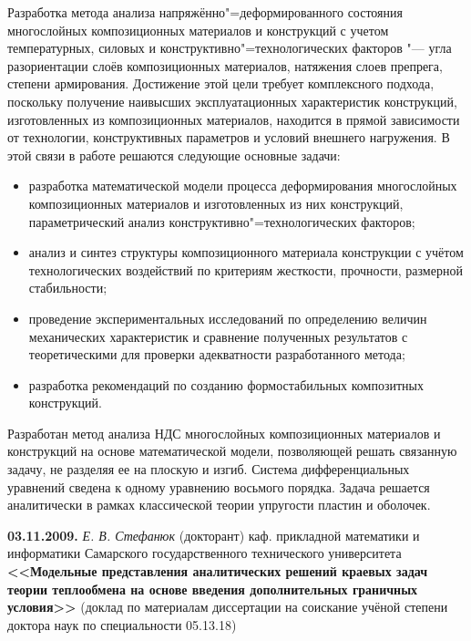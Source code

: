 {Разработка метода анализа напряжённо"=деформированного состояния многослойных композиционных материалов и конструкций с учетом температурных, силовых и конструктивно"=технологических факторов "--- угла разориентации слоёв композиционных материалов, натяжения слоев препрега, степени армирования.
Достижение этой цели требует комплексного подхода, поскольку получение наивысших эксплуатационных характеристик конструкций, изготовленных из композиционных материалов, находится в прямой зависимости от технологии, конструктивных параметров и условий внешнего нагружения. 
В этой связи в работе решаются следующие основные задачи:
\begin{itemize}
\item[--] разработка математической модели процесса деформирования многослойных композиционных материалов и изготовленных из них конструкций, параметрический анализ конструктивно"=технологических факторов;
\item[--] анализ и синтез структуры композиционного материала конструкции с учётом технологических воздействий по критериям жесткости, прочности, размерной стабильности;
\item[--] проведение экспериментальных исследований по определению величин механических характеристик и сравнение полученных результатов с теоретическими для проверки адекватности разработанного метода;
\item[--] разработка рекомендаций по созданию формостабильных композитных конструкций.
\end{itemize}

Разработан метод анализа НДС многослойных композиционных материалов и конструкций на основе математической модели, позволяющей решать связанную задачу, не разделяя ее на плоскую и изгиб. Система дифференциальных уравнений сведена к одному уравнению восьмого порядка. Задача решается аналитически в рамках классической теории упругости пластин и оболочек.


}

\bigskip

\noindent
{\bf 03.11.2009.} {\it Е. В. Стефанюк} {\footnotesize (докторант) каф. прикладной математики и информатики Самарского государственного технического университета} \\
{\bf <<Модельные представления аналитических решений  краевых задач теории теплообмена на основе введения дополнительных граничных условия>> } {\footnotesize (доклад по материалам диссертации на соискание учёной степени доктора наук по специальности 05.13.18)}

